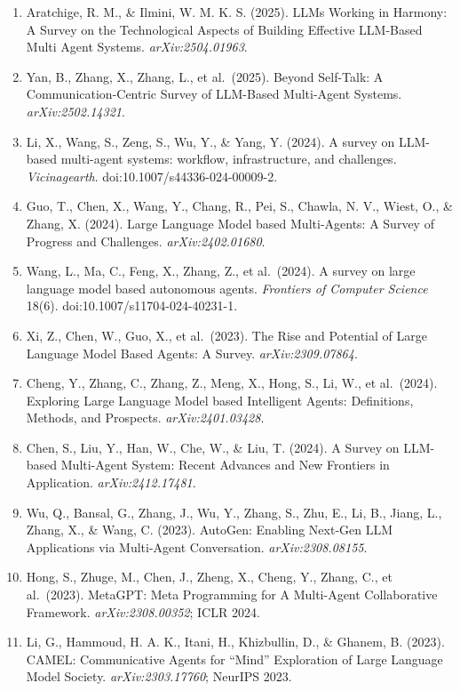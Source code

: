 \begin{enumerate}
\def\labelenumi{\arabic{enumi}.}
\item
  Aratchige, R. M., \& Ilmini, W. M. K. S. (2025). LLMs Working in Harmony: A Survey on the Technological Aspects of Building Effective LLM-Based Multi Agent Systems. \emph{arXiv:2504.01963}.
\item
  Yan, B., Zhang, X., Zhang, L., et al.~(2025). Beyond Self-Talk: A Communication-Centric Survey of LLM-Based Multi-Agent Systems. \emph{arXiv:2502.14321}.
\item
  Li, X., Wang, S., Zeng, S., Wu, Y., \& Yang, Y. (2024). A survey on LLM-based multi-agent systems: workflow, infrastructure, and challenges. \emph{Vicinagearth}. doi:10.1007/s44336-024-00009-2.
\item
  Guo, T., Chen, X., Wang, Y., Chang, R., Pei, S., Chawla, N. V., Wiest, O., \& Zhang, X. (2024). Large Language Model based Multi-Agents: A Survey of Progress and Challenges. \emph{arXiv:2402.01680}.
\item
  Wang, L., Ma, C., Feng, X., Zhang, Z., et al.~(2024). A survey on large language model based autonomous agents. \emph{Frontiers of Computer Science} 18(6). doi:10.1007/s11704-024-40231-1.
\item
  Xi, Z., Chen, W., Guo, X., et al.~(2023). The Rise and Potential of Large Language Model Based Agents: A Survey. \emph{arXiv:2309.07864}.
\item
  Cheng, Y., Zhang, C., Zhang, Z., Meng, X., Hong, S., Li, W., et al.~(2024). Exploring Large Language Model based Intelligent Agents: Definitions, Methods, and Prospects. \emph{arXiv:2401.03428}.
\item
  Chen, S., Liu, Y., Han, W., Che, W., \& Liu, T. (2024). A Survey on LLM-based Multi-Agent System: Recent Advances and New Frontiers in Application. \emph{arXiv:2412.17481}.
\item
  Wu, Q., Bansal, G., Zhang, J., Wu, Y., Zhang, S., Zhu, E., Li, B., Jiang, L., Zhang, X., \& Wang, C. (2023). AutoGen: Enabling Next-Gen LLM Applications via Multi-Agent Conversation. \emph{arXiv:2308.08155}.
\item
  Hong, S., Zhuge, M., Chen, J., Zheng, X., Cheng, Y., Zhang, C., et al.~(2023). MetaGPT: Meta Programming for A Multi-Agent Collaborative Framework. \emph{arXiv:2308.00352}; ICLR 2024.
\item
  Li, G., Hammoud, H. A. K., Itani, H., Khizbullin, D., \& Ghanem, B. (2023). CAMEL: Communicative Agents for ``Mind'' Exploration of Large Language Model Society. \emph{arXiv:2303.17760}; NeurIPS 2023.

\end{enumerate}
